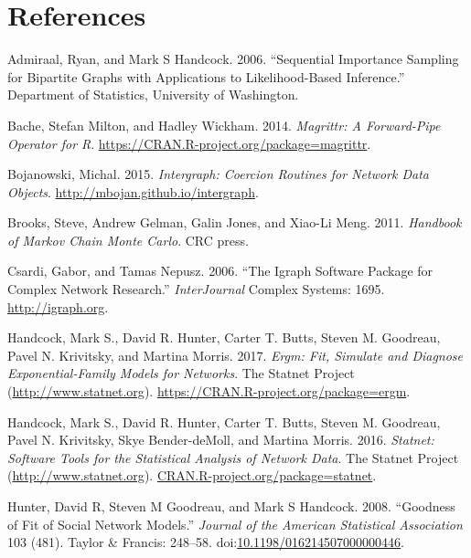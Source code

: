 \documentclass[]{book}
\theoremstyle{definition}
\theoremstyle{definition}
\theoremstyle{definition}
\theoremstyle{remark}
\begin{document}


\chapter*{References}\label{references}

\hypertarget{refs}{}
\hypertarget{ref-admiraal2006}{}
Admiraal, Ryan, and Mark S Handcock. 2006. ``Sequential Importance
Sampling for Bipartite Graphs with Applications to Likelihood-Based
Inference.'' Department of Statistics, University of Washington.

\hypertarget{ref-R-magrittr}{}
Bache, Stefan Milton, and Hadley Wickham. 2014. \emph{Magrittr: A
Forward-Pipe Operator for R}.
\url{https://CRAN.R-project.org/package=magrittr}.

\hypertarget{ref-R-intergraph}{}
Bojanowski, Michal. 2015. \emph{Intergraph: Coercion Routines for
Network Data Objects}. \url{http://mbojan.github.io/intergraph}.

\hypertarget{ref-brooks2011}{}
Brooks, Steve, Andrew Gelman, Galin Jones, and Xiao-Li Meng. 2011.
\emph{Handbook of Markov Chain Monte Carlo}. CRC press.

\hypertarget{ref-R-igraph}{}
Csardi, Gabor, and Tamas Nepusz. 2006. ``The Igraph Software Package for
Complex Network Research.'' \emph{InterJournal} Complex Systems: 1695.
\url{http://igraph.org}.

\hypertarget{ref-R-ergm}{}
Handcock, Mark S., David R. Hunter, Carter T. Butts, Steven M. Goodreau,
Pavel N. Krivitsky, and Martina Morris. 2017. \emph{Ergm: Fit, Simulate
and Diagnose Exponential-Family Models for Networks}. The Statnet
Project (\url{http://www.statnet.org}).
\url{https://CRAN.R-project.org/package=ergm}.

\hypertarget{ref-R-statnet}{}
Handcock, Mark S., David R. Hunter, Carter T. Butts, Steven M. Goodreau,
Pavel N. Krivitsky, Skye Bender-deMoll, and Martina Morris. 2016.
\emph{Statnet: Software Tools for the Statistical Analysis of Network
Data}. The Statnet Project (\url{http://www.statnet.org}).
\url{CRAN.R-project.org/package=statnet}.

\hypertarget{ref-HunterJASA2008}{}
Hunter, David R, Steven M Goodreau, and Mark S Handcock. 2008.
``Goodness of Fit of Social Network Models.'' \emph{Journal of the
American Statistical Association} 103 (481). Taylor \& Francis: 248--58.
doi:\href{https://doi.org/10.1198/016214507000000446}{10.1198/016214507000000446}.
\end{document}
